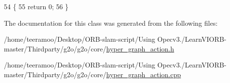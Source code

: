 \begin{DoxyCode}
54   \{
55     \textcolor{keywordflow}{return} 0;
56   \}
\end{DoxyCode}


The documentation for this class was generated from the following files\+:\begin{DoxyCompactItemize}
\item 
/home/teeramoo/\+Desktop/\+O\+R\+B-\/slam-\/script/\+Using Opecv3./\+Learn\+V\+I\+O\+R\+B-\/master/\+Thirdparty/g2o/g2o/core/\hyperlink{hyper__graph__action_8h}{hyper\+\_\+graph\+\_\+action.\+h}\item 
/home/teeramoo/\+Desktop/\+O\+R\+B-\/slam-\/script/\+Using Opecv3./\+Learn\+V\+I\+O\+R\+B-\/master/\+Thirdparty/g2o/g2o/core/\hyperlink{hyper__graph__action_8cpp}{hyper\+\_\+graph\+\_\+action.\+cpp}\end{DoxyCompactItemize}
